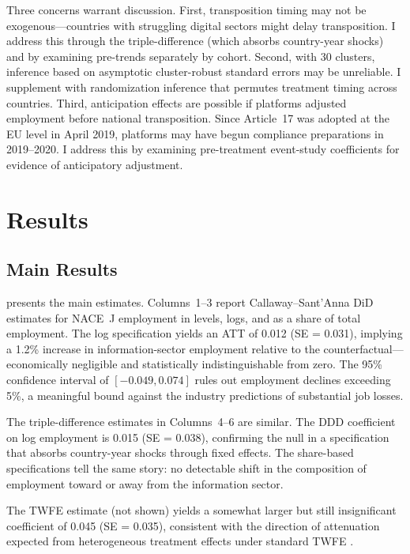 \documentclass[12pt]{article}
\begin{document}
Three concerns warrant discussion. First, transposition timing may not be exogenous---countries with struggling digital sectors might delay transposition. I address this through the triple-difference (which absorbs country-year shocks) and by examining pre-trends separately by cohort. Second, with 30 clusters, inference based on asymptotic cluster-robust standard errors may be unreliable. I supplement with randomization inference that permutes treatment timing across countries. Third, anticipation effects are possible if platforms adjusted employment before national transposition. Since Article~17 was adopted at the EU level in April 2019, platforms may have begun compliance preparations in 2019--2020. I address this by examining pre-treatment event-study coefficients for evidence of anticipatory adjustment.

\section{Results}

\subsection{Main Results}

 presents the main estimates. Columns~1--3 report Callaway--Sant'Anna DiD estimates for NACE~J employment in levels, logs, and as a share of total employment. The log specification yields an ATT of 0.012 (SE = 0.031), implying a 1.2\% increase in information-sector employment relative to the counterfactual---economically negligible and statistically indistinguishable from zero. The 95\% confidence interval of $[-0.049, 0.074]$ rules out employment declines exceeding 5\%, a meaningful bound against the industry predictions of substantial job losses.

The triple-difference estimates in Columns~4--6 are similar. The DDD coefficient on log employment is 0.015 (SE = 0.038), confirming the null in a specification that absorbs country-year shocks through fixed effects. The share-based specifications tell the same story: no detectable shift in the composition of employment toward or away from the information sector.

The TWFE estimate (not shown) yields a somewhat larger but still insignificant coefficient of 0.045 (SE = 0.035), consistent with the direction of attenuation expected from heterogeneous treatment effects under standard TWFE \citep{goodman2021difference}.
\end{document}
